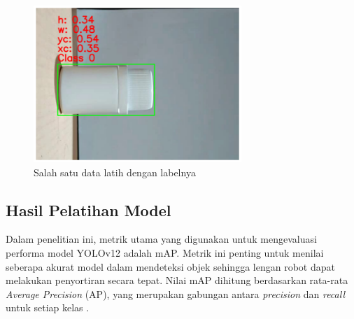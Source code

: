 \begin{figure}[H]
  \centering
  \includegraphics[width=0.7\textwidth]{gambar/anotasi.png}
  \caption{Salah satu data latih dengan labelnya}
  \label{fig:yolo-anotasi}
\end{figure}
\vspace{-1em}

\vspace{1em}

\subsection{Hasil Pelatihan Model}
\noindent
Dalam penelitian ini, metrik utama yang digunakan untuk mengevaluasi
performa model YOLOv12 adalah mAP. Metrik ini penting untuk menilai
seberapa akurat model dalam mendeteksi objek
sehingga lengan robot dapat melakukan penyortiran secara tepat. Nilai
mAP dihitung berdasarkan rata-rata \textit{Average Precision} (AP), yang
merupakan gabungan antara \textit{precision} dan \textit{recall}
untuk setiap kelas \citep{21}.


